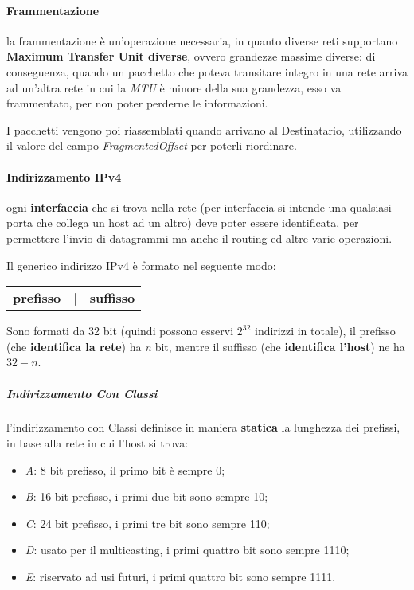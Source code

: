 \documentclass[a4paper]{article}
\begin{document}
				\paragraph{Frammentazione}
				\label{par:frammentazione}
					la frammentazione è un'operazione necessaria, in quanto diverse reti supportano \textbf{Maximum Transfer Unit diverse}, ovvero grandezze massime diverse: di conseguenza, quando un pacchetto che poteva transitare integro in una rete arriva ad un'altra rete in cui la \emph{MTU} è minore della sua grandezza, esso va frammentato, per non poter perderne le informazioni.
					
					I pacchetti vengono poi riassemblati quando arrivano al Destinatario, utilizzando il valore del campo \emph{FragmentedOffset} per poterli riordinare.
					
				\paragraph{Indirizzamento IPv4}
					ogni \textbf{interfaccia} che si trova nella rete (per interfaccia si intende una qualsiasi porta che collega un host ad un altro) deve poter essere identificata, per permettere l'invio di datagrammi ma anche il routing ed altre varie operazioni.
					
					Il generico indirizzo IPv4 è formato nel seguente modo:
					\begin{center}
						\begin{tabular}{ccc}
							\textbf{prefisso} & | & \textbf{suffisso} \\
						\end{tabular}
					\end{center}
					Sono formati da 32 bit (quindi possono esservi $ 2^{32} $ indirizzi in totale), il prefisso (che \textbf{identifica la rete}) ha \emph{n} bit, mentre il suffisso (che \textbf{identifica l'host}) ne ha $ 32 - n $.
					
					\subparagraph{Indirizzamento Con Classi}
						l'indirizzamento con Classi definisce in maniera \textbf{statica} la lunghezza dei prefissi, in base alla rete in cui l'host si trova:
						\begin{itemize}
							\item \emph{A}: 8 bit prefisso, il primo bit è sempre 0;
							\item \emph{B}: 16 bit prefisso, i primi due bit sono sempre 10;
							\item \emph{C}: 24 bit prefisso, i primi tre bit sono sempre 110;
							\item \emph{D}: usato per il multicasting, i primi quattro bit sono sempre 1110;
							\item \emph{E}: riservato ad usi futuri, i primi quattro bit sono sempre 1111.
						\end{itemize}
						
\end{document}
